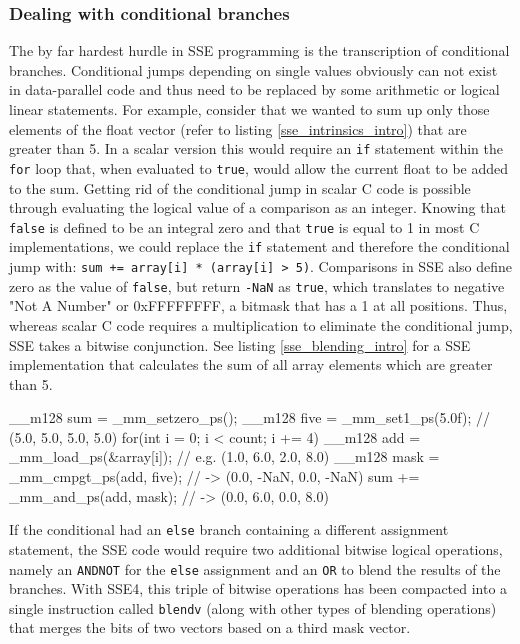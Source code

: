 \subsubsection{Dealing with conditional branches} 
The by far hardest hurdle in SSE programming is the transcription of conditional branches. Conditional jumps depending on single values obviously can not exist in data-parallel code and thus need to be replaced by some arithmetic or logical linear statements. For example, consider that we wanted to sum up only those elements of the float vector (refer to listing \ref{sse_intrinsics_intro}) that are greater than 5. In a scalar version this would require an \texttt{if} statement within the \texttt{for} loop that, when evaluated to \texttt{true}, would allow the current float to be added to the sum. Getting rid of the conditional jump in scalar C code is possible through evaluating the logical value of a comparison as an integer. Knowing that \texttt{false} is defined to be an integral zero and that \texttt{true} is equal to 1 in most C implementations, we could replace the \texttt{if} statement and therefore the conditional jump with: \texttt{sum += array[i] * (array[i] > 5)}. Comparisons in SSE also define zero as the value of \texttt{false}, but return \texttt{-NaN} as \texttt{true}, which translates to negative "Not A Number" or 0xFFFFFFFF, a bitmask that has a 1 at all positions. Thus, whereas scalar C code requires a multiplication to eliminate the conditional jump, SSE takes a bitwise conjunction. See listing \ref{sse_blending_intro} for a SSE implementation that calculates the sum of all array elements which are greater than 5.

\begin{code}[caption={Sum of array elements greater than 5}, label=sse_blending_intro]
  __m128 sum = _mm_setzero_ps();
  __m128 five = _mm_set1_ps(5.0f); // (5.0, 5.0, 5.0, 5.0)
  for(int i = 0; i < count; i += 4) {
    __m128 add = _mm_load_ps(&array[i]); // e.g. (1.0, 6.0, 2.0, 8.0)
    __m128 mask = _mm_cmpgt_ps(add, five); // -> (0.0, -NaN, 0.0, -NaN)
    sum += _mm_and_ps(add, mask); // -> (0.0, 6.0, 0.0, 8.0)
  }
\end{code}

If the conditional had an \texttt{else} branch containing a different assignment statement, the SSE code would require two additional bitwise logical operations, namely an \texttt{ANDNOT} for the \texttt{else} assignment and an \texttt{OR} to blend the results of the branches. With SSE4, this triple of bitwise operations has been compacted into a single instruction called \texttt{blendv} (along with other types of blending operations) that merges the bits of two vectors based on a third mask vector. 

